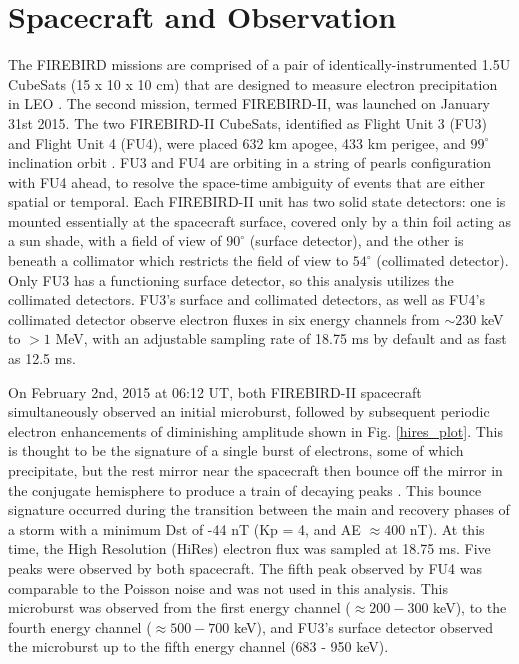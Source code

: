 \documentclass[draft, linenumbers]{agujournal}
\begin{document}
\section{Spacecraft and Observation} \label{obs} %
The FIREBIRD missions are comprised of a pair of identically-instrumented 1.5U CubeSats (15 x 10 x 10 cm) that are designed to measure electron precipitation in LEO \citep{Spence2012, Klumpar2015}. The second mission, termed FIREBIRD-II, was launched on January 31st 2015.  The two FIREBIRD-II CubeSats, identified as Flight Unit 3 (FU3) and Flight Unit 4 (FU4), were placed 632 km apogee, 433 km perigee, and $99^{\circ}$ inclination orbit \citep{Crew2016}. FU3 and FU4 are orbiting in a string of pearls configuration with FU4 ahead, to resolve the space-time ambiguity of events that are either spatial or temporal. Each FIREBIRD-II unit has two solid state detectors: one is mounted essentially at the spacecraft surface, covered only by a thin foil acting as a sun shade, with a field of view of $90^{\circ}$ (surface detector), and the other is beneath a collimator which restricts the field of view to $54^{\circ}$ (collimated detector). Only FU3 has a functioning surface detector, so this analysis utilizes the collimated detectors. FU3's surface and collimated detectors, as well as FU4's collimated detector observe electron fluxes in six energy channels from $\sim 230$ keV to $> 1$ MeV, with an adjustable sampling rate of 18.75 ms by default and as fast as 12.5 ms. 

On February 2nd, 2015 at 06:12 UT, both FIREBIRD-II spacecraft simultaneously observed an initial microburst, followed by subsequent periodic electron enhancements of diminishing amplitude shown in Fig. \ref{hires_plot}. This is thought to be the signature of a single burst of electrons, some of which precipitate, but the rest mirror near the spacecraft then bounce off the mirror in the conjugate hemisphere to produce a train of decaying peaks \citep{Blake1996, Thorne2005}. This bounce signature occurred during the transition between the main and recovery phases of a storm with a minimum Dst of -44 nT (Kp = 4, and AE ${\approx 400}$ nT). At this time, the High Resolution (HiRes) electron flux was sampled at 18.75 ms. Five peaks were observed by both spacecraft. The fifth peak observed by FU4 was comparable to the Poisson noise and was not used in this analysis. This microburst was observed from the first energy channel ($\approx 200-300$ keV), to the fourth energy channel ($\approx 500-700$ keV), and FU3's surface detector observed the microburst up to the fifth energy channel (683 - 950 keV). 
\end{document}

